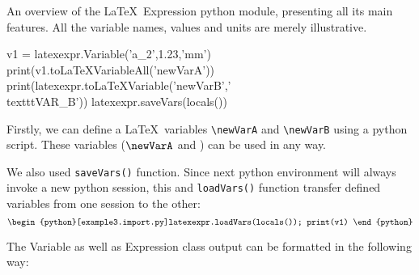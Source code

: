 \documentclass{report}
\begin{document}
An overview of the \LaTeX\ Expression python module, presenting all its main features.
All the variable names, values and units are merely illustrative.
\begin{python}
	v1 = latexexpr.Variable('a_2',1.23,'mm')
	print(v1.toLaTeXVariableAll('newVarA'))
	print(latexexpr.toLaTeXVariable('newVarB','\\texttt{VAR\_B}'))
	latexexpr.saveVars(locals())
\end{python}

Firstly, we can define a \LaTeX\ variables \texttt{\textbackslash newVarA}
and \texttt{\textbackslash newVarB} using a python script.
These variables ($\newVarA$ and \newVarB) can be used in any way.

We also used \texttt{saveVars()} function.
Since next python environment will always invoke a new python session,
this and \texttt{loadVars()} function transfer defined variables from one session to the other:
$$
\begin{python}[example3.import.py]latexexpr.loadVars(locals()); print(v1) \end{python}
$$

The Variable as well as Expression class output can be formatted in the following way:
\end{document}
